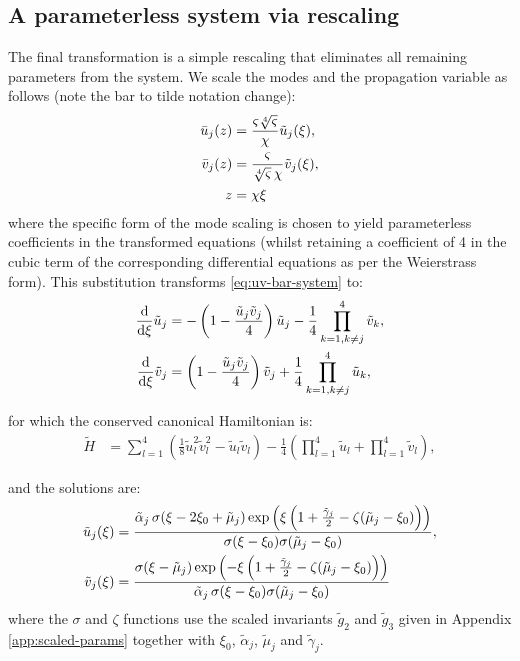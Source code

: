 \documentclass[11pt,a4paper]{article}
\numberwithin{equation}{section}
\begin{document}
\subsection{A parameterless system via rescaling}\label{subsec:tilde-coords}

The final transformation is a simple rescaling that eliminates all remaining parameters from the system.
We scale the modes and the propagation variable as follows (note the bar to tilde notation change):
\begin{align}
\bar{u}_j(z) &= \frac{\varsigma \sqrt[4]{\varsigma}}{\chi}\tilde{u}_j(\xi), \notag \\
\bar{v}_j(z) &= \frac{\varsigma }{\sqrt[4]{\varsigma}\,\chi}\tilde{v}_j(\xi), \notag \\
z &= \chi\xi
\end{align}
where the specific form of the mode scaling is chosen to yield parameterless coefficients in the transformed equations (whilst retaining a coefficient of 4 in the cubic term of the corresponding differential equations as per the Weierstrass form).
This substitution transforms \eqref{eq:uv-bar-system} to:
\begin{align}
\frac{\mathrm{d}}{\mathrm{d}\xi} \tilde{u}_j &= -\left(1 - \frac{\tilde{u}_j \tilde{v}_j}{4} \right) \tilde{u}_j - \frac{1}{4}\prod\limits_{k=1, k \ne j}^{4} \tilde{v}_k, \notag \\
\frac{\mathrm{d}}{\mathrm{d}\xi} \tilde{v}_j &= \left( 1 - \frac{\tilde{u}_j \tilde{v}_j}{4}\right) \tilde{v}_j + \frac{1}{4}\prod\limits_{k=1, k \ne j}^{4} \tilde{u}_k, \label{eq:uv-tilde-system}
\end{align}

for which the conserved canonical Hamiltonian is:
\begin{align}
\tilde{H} &= \sum_{l=1}^{4} \left(\frac{1}{8} \tilde{u}^{2}_l \tilde{v}^{2}_l  - \tilde{u}_l \tilde{v}_l \right) - \frac{1}{4}\left(\prod_{l=1}^{4} \tilde{u}_l + \prod_{l=1}^{4} \tilde{v}_l\right), \label{eq:H-tilde}
\end{align}

and the solutions are:
\begin{align}
\tilde{u}_j{\left(\xi\right)} &= \frac{\tilde{\alpha}_{j} \,\sigma{\left(\xi - 2 \xi_{0} + {\tilde{\mu}}_{j}\right)} \exp\left({\xi \left( 1 + \frac{{\tilde{\gamma}}_{j}}{2} - \zeta{\left( {\tilde{\mu}}_{j} - \xi_{0}\right)}\right)}\right)}{\sigma{\left(\xi - \xi_{0}\right)} \sigma{\left( {\tilde{\mu}}_{j} - \xi_{0}\right)}}, \notag \\
\tilde{v}_j{\left(\xi\right)} &= \frac{ \sigma{\left(\xi - {\tilde{\mu}}_{j}\right)} \exp\left({-\xi \left( 1 + \frac{{\tilde{\gamma}}_{j}}{2} - \zeta{\left( {\tilde{\mu}}_{j} - \xi_{0}\right)}\right)}\right)}{\tilde{\alpha}_{j} \,\sigma{\left(\xi - \xi_{0}\right)} \sigma{\left( {\tilde{\mu}}_{j} - \xi_{0}\right)}}  \label{eq:u-v-tilde}
\end{align}
where the $\sigma$ and $\zeta$ functions use the scaled invariants $\tilde{g}_2$ and $\tilde{g}_3$ given in Appendix \ref{app:scaled-params} together with $\xi_0$, $\tilde{\alpha}_j$, $\tilde{\mu}_j$ and $\tilde{\gamma}_j$.
\end{document}
